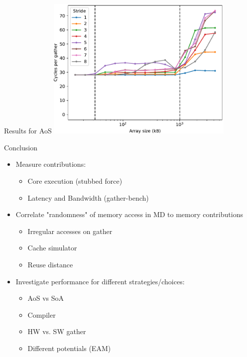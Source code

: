 \documentclass[aspectratio=169,t]{beamer}
\begin{document}
  \begin{frame}[fragile]{Results for AoS}
    \includegraphics[width=9cm]{gather_md_skylakesp2_results.pdf}
  \end{frame}

  \begin{frame}[fragile]{Conclusion}
    \begin{itemize}
      \item Measure contributions:
      \begin{itemize}
        \item Core execution (stubbed force)
        \item Latency and Bandwidth (gather-bench)
      \end{itemize}
      \item Correlate "randomness" of memory access in MD to memory contributions
      \begin{itemize}
        \item Irregular accesses on gather
        \item Cache simulator
        \item Reuse distance
      \end{itemize}
      \item Investigate performance for different strategies/choices:
      \begin{itemize}
        \item AoS vs SoA
        \item Compiler
        \item HW vs. SW gather
        \item Different potentials (EAM)
      \end{itemize}
    \end{itemize}
  \end{frame}

\end{document}
